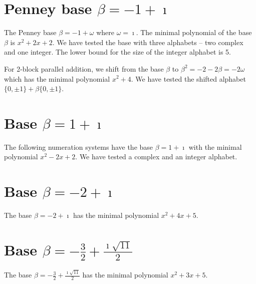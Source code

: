 


\section{\texorpdfstring{Penney base $\beta = -1 + \imath$}{Penney base beta = -1 + i}}
The Penney base $\beta = -1 + \omega$ where $\omega=\imath$. The minimal polynomial of the base $\beta$ is $x^2 + 2x+2$. We have tested the base with three alphabets -- two complex and one integer. The lower bound for the size of the integer alphabet is 5.


\newpage


For 2-block parallel addition, we shift from the base $\beta$ to $\beta^2=-2-2\beta=-2\omega$ which has the minimal polynomial $x^{2} + 4$. We have tested the shifted alphabet $\{0,\pm 1\}+\beta \{0,\pm 1\}$.



\section{\texorpdfstring{Base $\beta = 1 + \imath$}{Base beta = 1 + i}}
The following numeration systems have the base $\beta =1 + \imath$ with the minimal polynomial $x^2-2x+2$. We have tested a complex and an integer alphabet. 



 

\section{\texorpdfstring{Base $\beta = -2 + \imath$}{Base beta = -2 + i}}
The base  $\beta = -2 + \imath$ has the minimal polynomial $x^2+4x +5$.

% 
\section{\texorpdfstring{Base $\beta = -\frac{3}{2} + \frac{\imath \sqrt{11}}{2}$}{Base beta = -{3}/{2} + i sqrt(11)/{2}}}
The base $\beta = -\frac{3}{2} + \frac{\imath \sqrt{11}}{2}$ has the minimal polynomial  $x^2+3x +5$.


